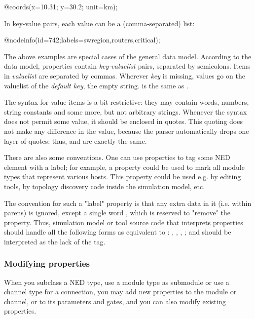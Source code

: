 \begin{ned}
@coords(x=10.31; y=30.2; unit=km);
\end{ned}

In key-value pairs, each value can be a (comma-separated) list:

\begin{ned}
@nodeinfo(id=742;labels=swregion,routers,critical);
\end{ned}

The above examples are special cases of the general data model. According
to the data model, properties contain \textit{key-valuelist} pairs,
separated by semicolons. Items in \textit{valuelist} are separated by
commas. Wherever \textit{key} is missing, values go on the valuelist of the
\textit{default key}, the empty string.  is the same
as .

The syntax for value items is a bit restrictive: they may contain words,
numbers, string constants and some more, but not arbitrary strings.
Whenever the syntax does not permit some value, it should be enclosed in
quotes. This quoting does not make any difference in the value, because
the parser automatically drops one layer of quotes; thus, 
and  are exactly the same.

There are also some conventions. One can use properties to tag some NED element
with a label; for example, a  property could be used to mark
all module types that represent various hosts. This property could be used
e.g. by editing tools, by topology discovery code inside the simulation model, etc.

The convention for such a "label" property is that any extra data in it
(i.e. within parens) is ignored, except a single word , which is
reserved to "remove" the property. Thus, simulation model or tool source
code that interprets properties should handle all the following forms as
equivalent to : , ,
, ; and
 should be interpreted as the lack of the 
tag.


\subsubsection{Modifying properties}

When you subclass a NED type, use a module type as submodule or use a channel
type for a connection, you may add new properties to the module or channel,
or to its parameters and gates, and you can also modify existing properties.

